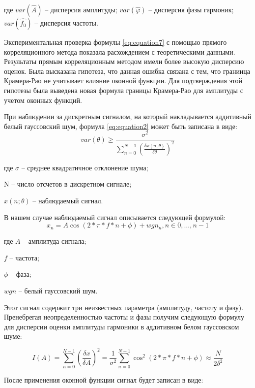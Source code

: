 где $var(\hat{A})$ -- дисперсия амплитуды;
$var(\hat{\varphi})$ -- дисперсия фазы гармоник; 
$var(\hat{f_0})$ -- дисперсия частоты.


Экспериментальная проверка формулы 	\ref{eq:equation7} с помощью прямого корреляционного метода показала расхождением с теоретическими данными. Результаты прямым корреляционным методом имели более высокую дисперсию оценок. Была высказана гипотеза, что данная ошибка связана с тем, что граниица Крамера-Рао не учитывает влияние оконной функции. Для подтверждения этой гипотезы была выведена новая формула границы Крамера-Рао для амплитуды с учетом оконных функций.
 
При наблюдении за дискретным сигналом, на который накладывается аддитивный белый гауссовский шум, формула \ref{eq:equation2} может быть записана в виде: 
\begin{equation}
	\label{eq:equation8}
	var(\theta)\geq\frac{\sigma^2}{\sum_{n=0}^{N-1}\left(\frac{\delta x(n;\theta)}{\delta\theta}\right)^2}
\end{equation}

где $\sigma $ -- среднее квадратичное отклонение шума;

N -- число отсчетов в дискретном сигнале;

$x(n;\theta)$ -- наблюдаемый сигнал.

В нашем случае наблюдаемый сигнал описывается следующей формулой:
\begin{equation}
	\label{eq:equation9}
	x_n=A\cos(2*\pi*f*n+\phi)+wgn_n, n\in0,…,n-1
\end{equation}

где $A$ -- амплитуда сигнала;

$f$ -- частота;

$\phi$ -- фаза;

$wgn$ -- белый гауссовский шум.

Этот сигнал содержит три неизвестных параметра (амплитуду, частоту и фазу). Пренебрегая неопределенностью частоты и фазы получим следующую формулу для дисперсии оценки амплитуды гармоники в аддитивном белом гауссовском шуме: 

\begin{equation}
	\label{eq:equation10}
	I(A)=\sum_{n=0}^{N-1}\left( \frac{\delta x}{\delta A} \right)^2 =\frac{1}{\sigma^2} \sum_{n=0}^{N-1}\cos^2 (2*\pi*f*n+\phi)\approx \frac{N}{2\delta ^2 }
\end{equation}

После применения оконной функции сигнал будет записан в виде: 

